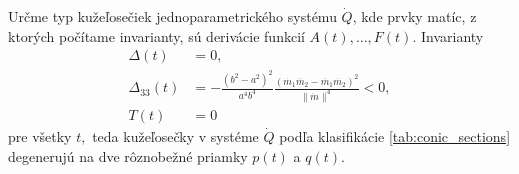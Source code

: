 %
Určme typ kužeľosečiek jednoparametrického systému $\dot{Q}$, kde prvky matíc, z ktorých počítame invarianty, sú derivácie funkcií $A(t), \dots, F(t).$ 
Invarianty
\begin{align*}
\Delta(t) &= 0, \\
\Delta_{33}(t) &=  -\frac{(b^2 - a^2)^2}{a^4b^4} \frac{ (\dot{m_1}\ddot{m_2} - \ddot{m_1}\dot{m_2})^2}{\|\dot{m}\|^4} < 0, \\
T(t) &= 0
\end{align*}
pre všetky $t,$ teda kužeľosečky v systéme $\dot{Q}$ podľa klasifikácie \ref{tab:conic_sections} degenerujú na dve rôznobežné priamky $p(t)$ a $q(t)$.

